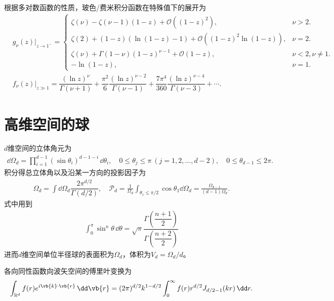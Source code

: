 根据多对数函数的性质，玻色/费米积分函数在特殊值下的展开为
\begin{align*}
	&g_{\nu}(z) \big|_{z \to 1^{-}} =
	\begin{cases}
		\zeta(\nu) - \zeta(\nu-1) (1 - z) + \mathcal{O}((1-z)^{2}),              & \nu > 2.             \\[4pt]
		\zeta(2) + (1 - z) (\ln(1 - z) - 1) + \mathcal{O}((1-z)^{2} \ln(1 - z)), & \nu = 2.             \\[4pt]
		\zeta(\nu) + \Gamma(1-\nu) (1 - z)^{\nu-1} + \mathcal{O}(1 - z),         & \nu < 2, \nu \neq 1. \\[4pt]
		-\ln(1 - z),                                                             & \nu = 1.
	\end{cases}\\
	&f_{\nu}(z) \big|_{z \gg 1} = \dfrac{(\ln z)^{\nu}}{\Gamma(\nu+1)} + \dfrac{\pi^{2}}{6} \dfrac{(\ln z)^{\nu-2}}{\Gamma(\nu-1)} + \dfrac{7\pi^{4}}{360} \dfrac{(\ln z)^{\nu-4}}{\Gamma(\nu-3)} + \cdots.
\end{align*}


\section{高维空间的球}

\(d\)维空间的立体角元为
\begin{align*}
	\dd \Omega_{d} = \prod_{i=1}^{d-1} (\sin\theta_{i})^{d-1-i} \, \dd \theta_{i}, \quad 0 \le \theta_{j} \le \pi \ (j = 1, 2, \ldots, d-2), \quad 0 \le \theta_{d-1} \le 2\pi.
\end{align*}
积分得总立体角以及沿某一方向的投影因子为
\begin{align*}
	\Omega_{d} =\int\dd\Omega_d \dfrac{2\pi^{d/2}}{\Gamma(d/2)},\quad \mathcal{P}_d=\frac{1}{\Omega_d}\int_{\theta_1\leq\pi/2}\cos\theta_1\dd\Omega_d=\frac{\Omega_{d-1}}{(d-1)\Omega_d}.
\end{align*}
式中用到
\begin{align*}
	\int_{0}^{\pi} \sin^{n}\theta \, \dd \theta = \sqrt{\pi} \dfrac{\Gamma\left( \dfrac{n+1}{2} \right)}{\Gamma\left( \dfrac{n+2}{2} \right)}
\end{align*}
进而\(d\)维空间单位半径球的表面积为\(\Omega_d\)，体积为\(V_d=\Omega_d/d\)。

各向同性函数向波矢空间的傅里叶变换为
\begin{align*}
	\int_{\mathbb{R}^{d}} f(r) e^{i \vb{k} \cdot \vb{r}} \, \dd \vb{r} = (2\pi)^{d/2} k^{1-d/2} \int_{0}^{\infty} f(r) r^{d/2} J_{d/2-1}(kr) \, \dd r.
\end{align*}

